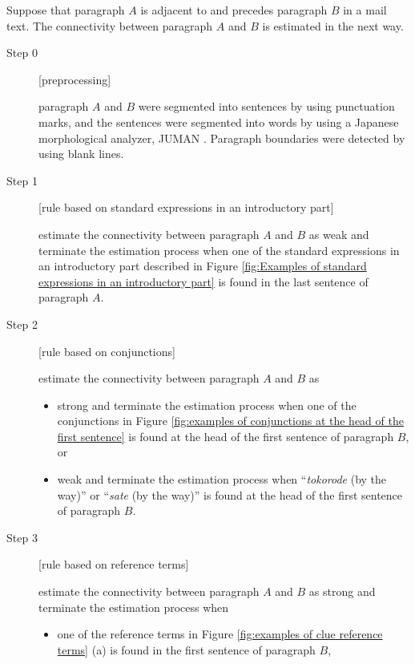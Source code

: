 \documentclass[english]{jnlp_1.4}
\begin{document}
Suppose that 
paragraph $A$ is adjacent to and precedes paragraph $B$ in a mail text.
The connectivity between paragraph $A$ and $B$ is estimated in the next way.
\begin{description}
 \item[Step 0] [preprocessing]

	    paragraph $A$ and $B$ were segmented into sentences 
	    by using punctuation marks, 
	    and the sentences were segmented into words   
	    by using a Japanese morphological analyzer, JUMAN \cite{man:juman05}.
	    Paragraph boundaries were detected by using blank lines.	    

 \item[Step 1] [rule based on standard expressions in an introductory part]

	    estimate the connectivity between paragraph $A$ and $B$ as weak
	    and terminate the estimation process
	    when one of the standard expressions in an introductory part 
	    described in 
	    Figure \ref{fig:Examples of standard expressions in an introductory part}
	    is found in the last sentence of paragraph $A$. 

 \item[Step 2] [rule based on conjunctions]

	    estimate the connectivity between paragraph $A$ and $B$ as 
	    \begin{itemize}
	     \item strong 
		   and terminate the estimation process
		   when one of the conjunctions in 
		   Figure \ref{fig:examples of conjunctions at the head of the first sentence} is
		   found at the head of the first sentence of paragraph $B$, or 
		   
	     \item weak 
		   and terminate the estimation process
		   when ``\textit{tokorode} (by the way)'' or ``\textit{sate} (by the way)'' 
		   is found at the head of the first sentence of paragraph $B$. 
		   
	    \end{itemize}


 \item[Step 3] [rule based on reference terms]

	    estimate the connectivity between paragraph $A$ and $B$ as strong
	    and terminate the estimation process
	    when 
	    \begin{itemize}
	     \item one of the reference terms 
		   in Figure \ref{fig:examples of clue reference terms} (a)
		   is found in the first sentence of paragraph $B$, 


\end{itemize}
\end{description}
\end{document}
